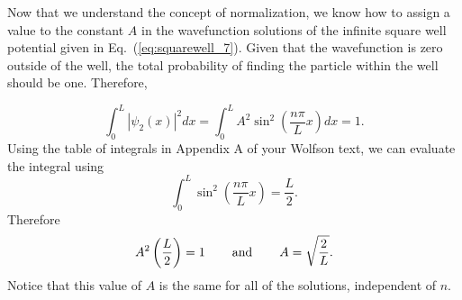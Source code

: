 Now that we understand the concept of normalization, we know how
to assign a value to the constant $A$ in the wavefunction solutions of
the infinite square well potential given in 
Eq.~(\ref{eq:squarewell_7}). Given that the wavefunction is zero outside
of the well, the total probability of finding the particle within the
well should be one.  Therefore,

\begin{equation}
\int_0^L |\psi_2(x)|^2 dx = \int_0^L A^2 \sin^2\left(\frac{n
  \pi}{L}x\right) dx = 1 .
\end{equation}
Using the table of integrals in Appendix A of your Wolfson text, we
can evaluate the integral using
\begin{equation}
\int_0^L \sin^2\left(\frac{n \pi}{L} x\right) = \frac{L}{2} .
\end{equation}
Therefore
\begin{equation}
A^2 \left( \frac{L}{2} \right) = 1 \hspace{0.3in} \mbox{and} \hspace{0.3in} A = \sqrt{\frac{2}{L}} .
\end{equation}
Notice that this value of $A$ is the same for all of the solutions,
independent of $n$.

